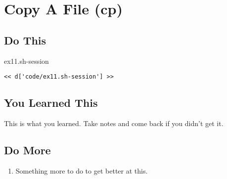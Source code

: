 \chapter{Copy A File (cp)}

\section{Do This}

\begin{code}{ex11.sh-session}
\begin{Verbatim}
<< d['code/ex11.sh-session'] >>
\end{Verbatim}
\end{code}


\section{You Learned This}

This is what you learned.  Take notes and come back if you didn't get it.

\section{Do More}

\begin{enumerate}
\item Something more to do to get better at this.
\end{enumerate}

